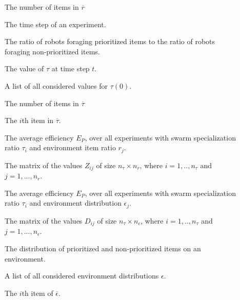 \begin{description}
	\item[\parbox{\namewidth}{$n_r$}] The number of items in $\overline{r}$	

	\item[\parbox{\namewidth}{$t$}] The time step of an experiment.	

	\item[\parbox{\namewidth}{$\tau$}] The ratio of robots foraging prioritized items to the ratio of robots foraging non-prioritized items.

	\item[\parbox{\namewidth}{$\tau(t)$}] The value of $\tau$ at time step $t$.

	\item[\parbox{\namewidth}{$\overline{\tau}$}] A list of all considered values for $\tau(0)$.

	\item[\parbox{\namewidth}{$n_\tau$}] The number of items in $\overline{\tau}$

	\item[\parbox{\namewidth}{$\tau_i(0)$}] The $i$th item in $\overline{\tau}$.

	\item[\parbox{\namewidth}{$Z_{ij}$}] The average efficiency $E_P$, over all experiments with swarm specialization ratio $\tau_i$ and environment item ratio $r_j$.
	
	\item[\parbox{\namewidth}{$Z$}] The matrix of the values $Z_{ij}$ of size $n_\tau \times n_r$, where $i=1,..,n_\tau$ and $j=1,...,n_r$.

	\item[\parbox{\namewidth}{$D_{ij}$}] The average efficiency $E_P$, over all experiments with swarm specialization ratio $\tau_i$ and environment distribution $\epsilon_j$.
	
	\item[\parbox{\namewidth}{$D$}] The matrix of the values $D_{ij}$ of size $n_\tau \times n_\epsilon$, where $i=1,..,n_\tau$ and $j=1,...,n_\epsilon$.
	

	\item[\parbox{\namewidth}{$\epsilon$}] The distribution of prioritized and non-prioritized items on an environment.

	\item[\parbox{\namewidth}{$\overline{\epsilon}$}] A list of all considered environment distributions $\epsilon$.

	\item[\parbox{\namewidth}{$\epsilon_i$}] The $i$th item of $\overline{\epsilon}$.


\end{description}
